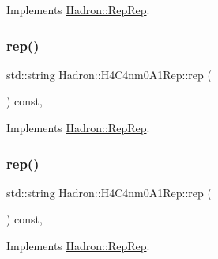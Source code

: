 Implements \mbox{\hyperlink{structHadron_1_1RepRep_ab3213025f6de249f7095892109575fde}{Hadron\+::\+Rep\+Rep}}.

\mbox{\label{structHadron_1_1H4C4nm0A1Rep_a3f4b3af1601f3bc5c2a954c3e8c13c18}} 
\subsubsection{\texorpdfstring{rep()}{rep()}\hspace{0.1cm}{\footnotesize\ttfamily [2/5]}}
{\footnotesize\ttfamily std\+::string Hadron\+::\+H4\+C4nm0\+A1\+Rep\+::rep (\begin{DoxyParamCaption}{ }\end{DoxyParamCaption}) const\hspace{0.3cm}{\ttfamily [inline]}, {\ttfamily [virtual]}}



Implements \mbox{\hyperlink{structHadron_1_1RepRep_ab3213025f6de249f7095892109575fde}{Hadron\+::\+Rep\+Rep}}.

\mbox{\label{structHadron_1_1H4C4nm0A1Rep_a3f4b3af1601f3bc5c2a954c3e8c13c18}} 
\subsubsection{\texorpdfstring{rep()}{rep()}\hspace{0.1cm}{\footnotesize\ttfamily [3/5]}}
{\footnotesize\ttfamily std\+::string Hadron\+::\+H4\+C4nm0\+A1\+Rep\+::rep (\begin{DoxyParamCaption}{ }\end{DoxyParamCaption}) const\hspace{0.3cm}{\ttfamily [inline]}, {\ttfamily [virtual]}}



Implements \mbox{\hyperlink{structHadron_1_1RepRep_ab3213025f6de249f7095892109575fde}{Hadron\+::\+Rep\+Rep}}.

\mbox{\label{structHadron_1_1H4C4nm0A1Rep_a3f4b3af1601f3bc5c2a954c3e8c13c18}} 
